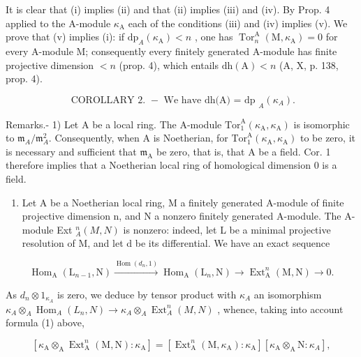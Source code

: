 It is clear that (i) implies (ii) and that (ii) implies (iii) and (iv). By Prop. 4 applied to the A-module \(\kappa_{\mathrm{A}}\) each of the conditions (iii) and (iv) implies (v). We prove that (v) implies (i): if \(\mathrm{dp}_{A}(\kappa_{\mathrm{A}}) < n\) , one has \(\operatorname{Tor}_{n}^{\mathrm{A}}(\mathrm{M}, \kappa_{\mathrm{A}}) = 0\) for every A-module M; consequently every finitely generated A-module has finite projective dimension \(< n\) (prop. 4), which entails \(\mathrm{dh}(\mathrm{A}) < n\) (A, X, p. 138, prop. 4).

\[
\text { COROLLARY   2. } - \text { We   have   dh(A) = dp } _ {A} (\kappa_ {A})  .
\]

Remarks.- 1) Let A be a local ring. The A-module \(\mathrm{Tor}_{1}^{\mathrm{A}}(\kappa_{\mathrm{A}},\kappa_{\mathrm{A}})\) is isomorphic to \(\mathfrak{m}_{A}/\mathfrak{m}_{A}^{2}\). Consequently, when A is Noetherian, for \(\mathrm{Tor}_{1}^{\mathrm{A}}(\kappa_{\mathrm{A}},\kappa_{\mathrm{A}})\) to be zero, it is necessary and sufficient that \(\mathfrak{m}_{\mathrm{A}}\) be zero, that is, that A be a field. Cor. 1 therefore implies that a Noetherian local ring of homological dimension 0 is a field.

\begin{enumerate}
\def\labelenumi{\arabic{enumi})}
\setcounter{enumi}{1}
\tightlist
\item
  Let A be a Noetherian local ring, M a finitely generated A-module of finite projective dimension n, and N a nonzero finitely generated A-module. The A-module Ext \(_{A}^{n}(M,N)\) is nonzero: indeed, let L be a minimal projective resolution of M, and let d be its differential. We have an exact sequence
\end{enumerate}

\[
\operatorname{Hom} _ {\mathrm{A}} \left(\mathrm{L} _ {n - 1}, \mathrm{N}\right) \xrightarrow {\operatorname{Hom} \left(d _ {n} , 1\right)} \operatorname{Hom} _ {\mathrm{A}} \left(\mathrm{L} _ {n}, \mathrm{N}\right) \longrightarrow \operatorname{Ext} _ {\mathrm{A}} ^ {n} (\mathrm{M}, \mathrm{N}) \rightarrow 0.
\]

As \(d_n \otimes 1_{\kappa_A}\) is zero, we deduce by tensor product with \(\kappa_A\) an isomorphism \(\kappa_A \otimes_A \operatorname{Hom}_A(L_n, N) \longrightarrow \kappa_A \otimes_A \operatorname{Ext}_A^n(M, N)\) , whence, taking into account formula (1) above,

\[
\left[ \kappa_ {\mathrm{A}} \otimes_ {\mathrm{A}} \operatorname{Ext} _ {\mathrm{A}} ^ {n} (\mathrm{M}, \mathrm{N}): \kappa_ {\mathrm{A}} \right] = \left[ \operatorname{Ext} _ {\mathrm{A}} ^ {n} (\mathrm{M}, \kappa_ {\mathrm{A}}): \kappa_ {\mathrm{A}} \right] \left[ \kappa_ {\mathrm{A}} \otimes_ {\mathrm{A}} \mathrm{N}: \kappa_ {A} \right],
\]

